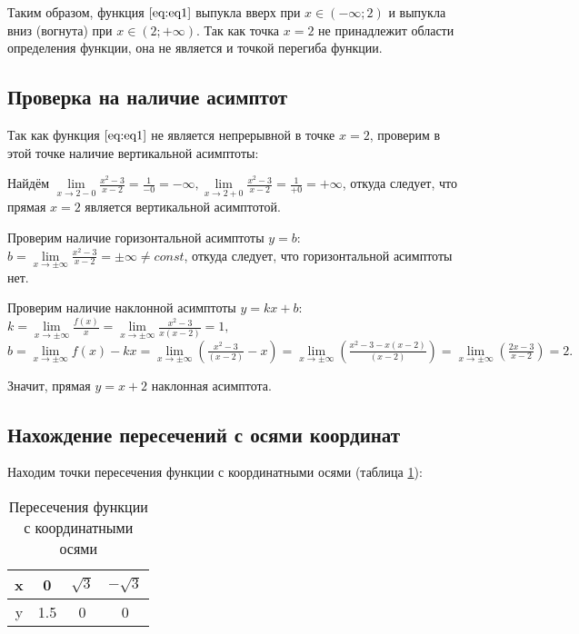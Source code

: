 Таким образом, функция $\eqref{eq:eq1}$ выпукла вверх при $x \in (-\infty; 2)$ и выпукла вниз (вогнута) при $x \in (2; +\infty)$. Так как точка $x = 2$ не принадлежит области определения функции, она не является и точкой перегиба функции.

\subsection{Проверка на наличие асимптот}

Так как функция $\eqref{eq:eq1}$ не является непрерывной в точке $x = 2$, проверим в этой точке наличие вертикальной асимптоты:

Найдём $\lim\limits_{x\to 2-0} \frac{x^2-3}{x-2} = \frac{1}{-0} = -\infty, \lim\limits_{x\to 2+0} \frac{x^2-3}{x-2} = \frac{1}{+0} = +\infty$, откуда следует, что прямая $x = 2$ является вертикальной асимптотой.

Проверим наличие горизонтальной асимптоты $y = b$: $b = \lim\limits_{x\to \pm \infty} \frac{x^2-3}{x-2} =  \pm \infty \neq const$, откуда следует, что горизонтальной асимптоты нет.

Проверим наличие наклонной асимптоты $y = kx + b$: $k = \lim\limits_{x\to \pm \infty} \frac{f(x)}{x} = \lim\limits_{x\to \pm \infty} \frac{x^2-3}{x(x-2)} = 1,$ $b = \lim\limits_{x\to \pm \infty} f(x) - kx = \lim\limits_{x\to \pm \infty} \left(\frac{x^2-3}{(x-2)}-x\right) = \lim\limits_{x\to \pm \infty} \left(\frac{x^2-3-x(x-2)}{(x-2)}\right) = \lim\limits_{x\to \pm \infty}\left(\frac{2x-3}{x-2}\right) = 2.$

Значит, прямая $y = x + 2$ наклонная асимптота.

\subsection{Нахождение пересечений с осями координат}

Находим точки пересечения функции с координатными осями (таблица \ref{tabular:tab1}): 

\begin{table}[H]
	\caption{Пересечения функции с координатными осями}
	\begin{center}
		\begin{tabular}{|c|c|c|c|}
			\hline
			x & 0 & $\sqrt{3}$ & $-\sqrt{3}$ \\ \hline
			y & 1.5 & 0 & 0 \\ \hline
		\end{tabular}
		\label{tabular:tab1}
	\end{center}
\end{table}

